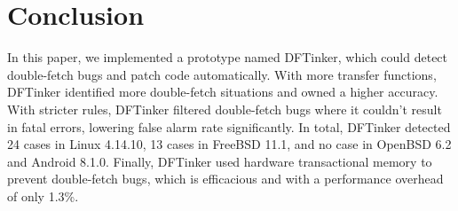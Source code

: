 \documentclass[10pt]{llncs}
\begin{document}
\section{Conclusion}
\label{conclusion}

In this paper, we implemented a prototype named DFTinker, which could detect double-fetch bugs and patch code automatically. With more transfer functions, DFTinker identified more double-fetch situations and owned a higher accuracy. With stricter rules, DFTinker filtered double-fetch bugs where it couldn't result in fatal errors, lowering false alarm rate significantly. In total, DFTinker detected 24 cases in Linux 4.14.10, 13 cases in FreeBSD 11.1, and no case in OpenBSD 6.2 and Android 8.1.0. Finally, DFTinker used hardware transactional memory to prevent double-fetch bugs, which is efficacious and with a performance overhead of only 1.3\%.







\end{document}
